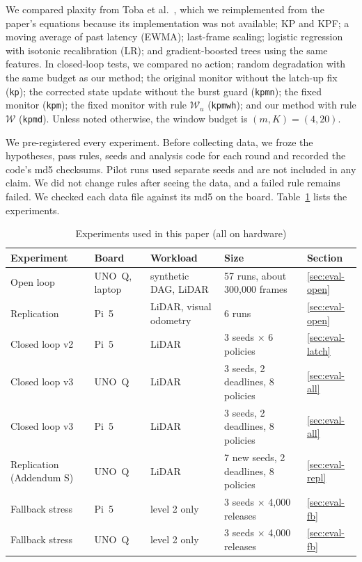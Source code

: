 \documentclass[acmsmall,screen]{acmart}
\newcommand{\pol}[1]{\texttt{#1}}
\newcommand{\Wu}{$\mathcal{W}_u$}
\newcommand{\Wl}{$\mathcal{W}$}
\begin{document}
We compared plaxity from Toba et al.~\cite{toba2026}, which we reimplemented from the paper's equations because its implementation was not available; KP and KPF; a moving average of past latency (EWMA); last-frame scaling; logistic regression with isotonic recalibration (LR); and gradient-boosted trees using the same features. In closed-loop tests, we compared no action; random degradation with the same budget as our method; the original monitor without the latch-up fix (\pol{kp}); the corrected state update without the burst guard (\pol{kpmn}); the fixed monitor (\pol{kpm}); the fixed monitor with rule \Wu{} (\pol{kpmwh}); and our method with rule \Wl{} (\pol{kpmd}). Unless noted otherwise, the window budget is $(m,K)=(4,20)$.

We pre-registered every experiment. Before collecting data, we froze the hypotheses, pass rules, seeds and analysis code for each round and recorded the code's md5 checksums. Pilot runs used separate seeds and are not included in any claim. We did not change rules after seeing the data, and a failed rule remains failed. We checked each data file against its md5 on the board. Table~\ref{tab:setup} lists the experiments.

\begin{table}[t]
\caption{Experiments used in this paper (all on hardware)}
\label{tab:setup}
\footnotesize
\begin{tabular}{@{}lllll@{}}
\toprule
Experiment & Board & Workload & Size & Section \\
\midrule
Open loop & UNO~Q, laptop & synthetic DAG, LiDAR & 57 runs, about 300{,}000 frames & \ref{sec:eval-open} \\
Replication & Pi~5 & LiDAR, visual odometry & 6 runs & \ref{sec:eval-open} \\
Closed loop v2 & Pi~5 & LiDAR & 3 seeds $\times$ 6 policies & \ref{sec:eval-latch} \\
Closed loop v3 & UNO~Q & LiDAR & 3 seeds, 2 deadlines, 8 policies & \ref{sec:eval-all} \\
Closed loop v3 & Pi~5 & LiDAR & 3 seeds, 2 deadlines, 8 policies & \ref{sec:eval-all} \\
Replication (Addendum S) & UNO~Q & LiDAR & 7 new seeds, 2 deadlines, 8 policies & \ref{sec:eval-repl} \\
Fallback stress & Pi~5 & level 2 only & 3 seeds $\times$ 4{,}000 releases & \ref{sec:eval-fb} \\
Fallback stress & UNO~Q & level 2 only & 3 seeds $\times$ 4{,}000 releases & \ref{sec:eval-fb} \\
\bottomrule
\end{tabular}
\end{table}
\end{document}
